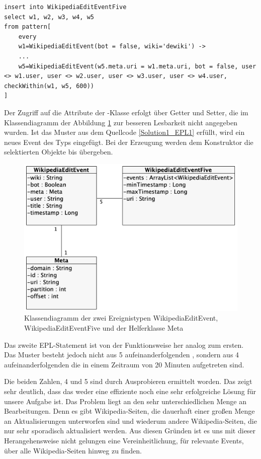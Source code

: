 \begin{lstlisting}[label=Solution1_EPL1,caption=Lösung 1: EPL-Statement 1,language=epl,firstnumber=1,captionpos=b]
insert into WikipediaEditEventFive
select w1, w2, w3, w4, w5
from pattern[
    every
    w1=WikipediaEditEvent(bot = false, wiki='dewiki') ->
    ...
    w5=WikipediaEditEvent(w5.meta.uri = w1.meta.uri, bot = false, user <> w1.user, user <> w2.user, user <> w3.user, user <> w4.user, checkWithin(w1, w5, 600))
]
\end{lstlisting}

Der Zugriff auf die Attribute der -Klasse erfolgt über Getter und Setter, die im Klassendiagramm
der Abbildung \ref{fig:class_diagram_eventtypes} zur besseren Lesbarkeit nicht angegeben wurden.
Ist das Muster aus dem Quellcode \ref{Solution1_EPL1} erfüllt, wird ein neues Event des Typs 
eingefügt. Bei der Erzeugung werden dem Konstruktor die selektierten Objekte  bis  übergeben.

\begin{figure}[h]
    \includegraphics[width=.5\textwidth]{images/Esper1.png}
    \caption{Klassendiagramm der zwei Ereignistypen WikipediaEditEvent, WikipediaEditEventFive und der Helferklasse Meta}
    \label{fig:class_diagram_eventtypes}
\end{figure}

Das zweite EPL-Statement ist von der Funktionsweise her analog zum ersten. Das Muster besteht jedoch nicht aus
5 aufeinanderfolgenden , sondern aus
4 aufeinanderfolgenden  die in einem Zeitraum von 20 Minuten aufgetreten sind.

Die beiden Zahlen, 4 und 5 sind durch Ausprobieren ermittelt worden. Das zeigt sehr deutlich, dass das weder eine
effiziente noch eine sehr erfolgreiche Lösung für unsere Aufgabe ist.
Das Problem liegt an den sehr unterschiedlichen Menge an Bearbeitungen.
Denn es gibt Wikipedia-Seiten, die dauerhaft einer großen Menge an Aktualisierungen unterworfen sind und wiederum andere Wikipedia-Seiten, die
nur sehr sporadisch aktualisiert werden. Aus diesen Gründen ist es uns mit dieser Herangehensweise
nicht gelungen eine Vereinheitlichung, für relevante Events, über alle Wikipedia-Seiten hinweg zu finden.

